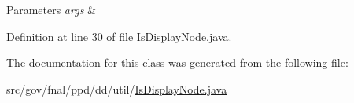 \begin{DoxyParams}{Parameters}
{\em args} & \\
\hline
\end{DoxyParams}


Definition at line 30 of file Is\-Display\-Node.\-java.



The documentation for this class was generated from the following file\-:\begin{DoxyCompactItemize}
\item 
src/gov/fnal/ppd/dd/util/\hyperlink{IsDisplayNode_8java}{Is\-Display\-Node.\-java}\end{DoxyCompactItemize}
